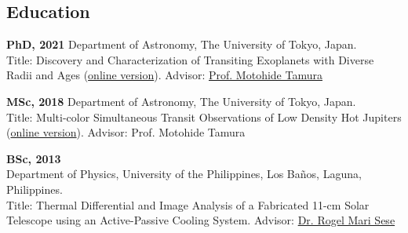 \documentclass[11pt,letterpaper]{article}
\begin{document}
\subsection{Education}
\begin{list}{}{\cvlist}
    \item
        \textbf{PhD, 2021} Department of Astronomy, The University of Tokyo, Japan.\\
        Title: Discovery and Characterization of Transiting Exoplanets with Diverse Radii and Ages (\href{\phdthesisurl}{online version}).
        Advisor: \href{\tamuraurl}{Prof. Motohide Tamura}
    \item
        \textbf{MSc, 2018} Department of Astronomy, The University of Tokyo, Japan.\\
        Title: Multi-color Simultaneous Transit Observations of Low Density Hot Jupiters (\href{https://github.com/jpdeleon/thesis-master/tree/master}{online version}).
        Advisor: Prof. Motohide Tamura
    \item
        \textbf{BSc, 2013}\\
        Department of Physics, University of the Philippines, Los Ba\~nos, Laguna, Philippines.\\
        Title: Thermal Differential and Image Analysis of a Fabricated 11-cm Solar Telescope using an Active-Passive Cooling System.
        Advisor: \href{\seseurl}{Dr. Rogel Mari Sese}      
\end{list}
\end{document}
